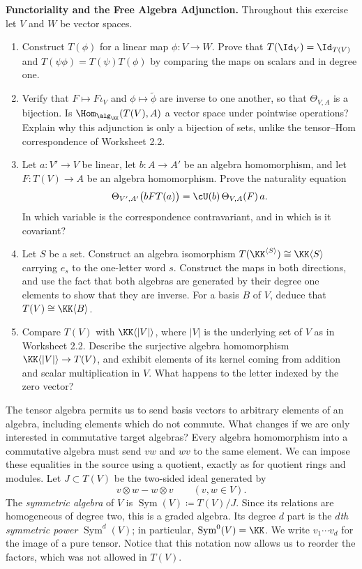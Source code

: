 \documentclass[12pt,reqno]{amsart}
\DeclareMathOperator{\Sym}{Sym}
\begin{document}
\begin{problems}
\item\label{s:tensorfunctor} \textbf{Functoriality and the Free Algebra Adjunction.} Throughout this exercise let $V$ and $W$ be vector spaces.
\begin{enumerate}
\item Construct $T(\phi)$ for a linear map $\phi:V\to W$. Prove that $T(\Id_V)=\Id_{T(V)}$ and $T(\psi\phi)=T(\psi)T(\phi)$ by comparing the maps on scalars and in degree one.
\item Verify that $F\mapsto F\iota_V$ and $\phi\mapsto\widetilde\phi$ are inverse to one another, so that $\Theta_{V,A}$ is a bijection. Is $\Hom_{\alg_{\KK}}(T(V),A)$ a vector space under pointwise operations? Explain why this adjunction is only a bijection of sets, unlike the tensor--Hom correspondence of Worksheet 2.2.
\item Let $a:V'\to V$ be linear, let $b:A\to A'$ be an algebra homomorphism, and let $F:T(V)\to A$ be an algebra homomorphism. Prove the naturality equation
\[
\Theta_{V',A'}\bigl(bFT(a)\bigr)=\cU(b)\,\Theta_{V,A}(F)\,a.
\]
In which variable is the correspondence contravariant, and in which is it covariant?
\item Let $S$ be a set. Construct an algebra isomorphism $T(\KK^{\langle S\rangle})\cong\KK\langle S\rangle$ carrying $e_s$ to the one-letter word $s$. Construct the maps in both directions, and use the fact that both algebras are generated by their degree one elements to show that they are inverse. For a basis $B$ of $V$, deduce that $T(V)\cong\KK\langle B\rangle$.
\item Compare $T(V)$ with $\KK\langle|V|\rangle$, where $|V|$ is the underlying set of $V$ as in Worksheet 2.2. Describe the surjective algebra homomorphism $\KK\langle|V|\rangle\to T(V)$, and exhibit elements of its kernel coming from addition and scalar multiplication in $V$. What happens to the letter indexed by the zero vector?
\end{enumerate}
\end{problems}

\hrulefill

The tensor algebra permits us to send basis vectors to arbitrary elements of an algebra, including elements which do not commute. What changes if we are only interested in commutative target algebras? Every algebra homomorphism into a commutative algebra must send $vw$ and $wv$ to the same element. We can impose these equalities in the source using a quotient, exactly as for quotient rings and modules. Let $J\subset T(V)$ be the two-sided ideal generated by
\[
v\otimes w-w\otimes v\qquad(v,w\in V).
\]
The \emph{symmetric algebra} of $V$ is $\Sym(V)\coloneqq T(V)/J$. Since its relations are homogeneous of degree two, this is a graded algebra. Its degree $d$ part is the \emph{$d$th symmetric power} $\Sym^d(V)$; in particular, $\Sym^0(V)=\KK$. We write $v_1\cdots v_d$ for the image of a pure tensor. Notice that this notation now allows us to reorder the factors, which was not allowed in $T(V)$.
\end{document}
